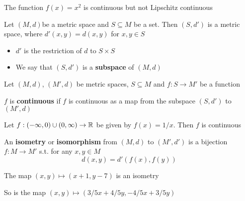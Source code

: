\documentclass[11pt]{article}
\begin{document}
\begin{examplle}[]
The function \(f(x)=x^2\) is continuous but not Lipschitz continuous
\end{examplle}

\begin{definition}[]
Let \((M,d)\)be a metric space and \(S\subseteq M\) be a set. Then \((S,d')\) is a metric space,
where \(d'(x,y)=d(x,y)\) for \(x,y\in S\)
\begin{itemize}
\item \(d'\) is the restriction of \(d\) to \(S\times S\)
\item We say that \((S,d')\) is a \textbf{subspace} of \((M,d)\)
\end{itemize}
\end{definition}

Let \((M,d)\), \((M',d)\) be metric spaces, \(S\subseteq M\) and \(f:S\to M'\) be a function

\begin{definition}[]
\(f\)  is \textbf{continuous} if \(f\) is continuous as a map from the subspace \((S,d')\) to \((M',d)\)
\end{definition}

\begin{examplle}[in \(\R\)]
Let \(f:(-\infty,0)\cup(0,\infty)\to\mathbb{R}\)  be given by \(f(x)=1/x\). Then \(f\) is continuous
\end{examplle}

\begin{definition}[]
An \textbf{isometry} or \textbf{isomorphism} from \((M,d)\) to \((M',d')\) is a bijection \(f:M\to M'\) s.t. for
any \(x,y\in M\)
\begin{equation*}
d(x,y)=d'(f(x),f(y))
\end{equation*}
\end{definition}

\begin{examplle}[in \(\R^2\)]
The map \((x,y)\mapsto(x+1,y-7)\) is an isometry

So is the map \((x,y)\mapsto(3/5x+4/5y,-4/5x+3/5y)\)
\end{examplle}
\end{document}

